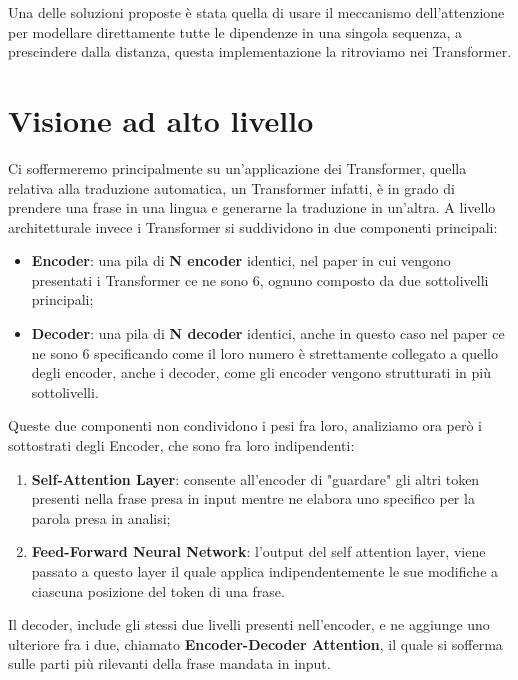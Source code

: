 Una delle soluzioni proposte è stata quella di usare il meccanismo dell'attenzione per modellare direttamente tutte le dipendenze in una singola sequenza, a prescindere dalla distanza, questa implementazione la ritroviamo nei Transformer.

\section{Visione ad alto livello}
Ci soffermeremo principalmente su un'applicazione dei Transformer, quella relativa alla traduzione automatica, un Transformer infatti, è in grado di prendere una frase in una lingua e generarne la traduzione in un'altra. A livello architetturale invece i Transformer si suddividono in due componenti principali:
\begin{itemize}
    \item \textbf{Encoder}: una pila di \textbf{N encoder} identici, nel paper in cui vengono presentati i Transformer ce ne sono 6, ognuno composto da due sottolivelli principali;
    \item \textbf{Decoder}: una pila di \textbf{N decoder} identici, anche in questo caso nel paper ce ne sono 6 specificando come il loro numero è strettamente collegato a quello degli encoder, anche i decoder, come gli encoder vengono strutturati in più sottolivelli.
\end{itemize}

Queste due componenti non condividono i pesi fra loro, analiziamo ora però i sottostrati degli Encoder, che sono fra loro indipendenti:

\begin{enumerate}
    \item \textbf{Self-Attention Layer}: consente all'encoder di "guardare" gli altri token presenti nella frase presa in input mentre ne elabora uno specifico per la parola presa in analisi;
    \item \textbf{Feed-Forward Neural Network}: l'output del self attention layer, viene passato a questo layer il quale applica indipendentemente le sue modifiche a ciascuna posizione del token di una frase.
\end{enumerate}

Il decoder, include gli stessi due livelli presenti nell'encoder, e ne aggiunge uno ulteriore fra i due, chiamato \textbf{Encoder-Decoder Attention}, il quale si sofferma sulle parti più rilevanti della frase mandata in input.

